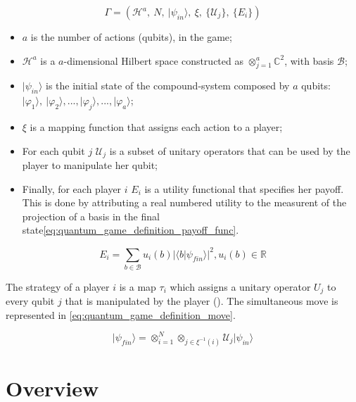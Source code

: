 \begin{equation}
\Gamma=(\mathcal{H}^{a},\: N,\:\vert\psi_{in}\rangle,\:\xi,\:\{\mathcal{U}_{j}\},\:\{E_{i}\})\label{eq:quantum_game_six_tuple}
\end{equation}

\begin{itemize}
\item $a$ is the number of actions (qubits), in the game; 
\item $\mathcal{H}^{a}$ is a $a$-dimensional Hilbert space constructed
as $\otimes_{j=1}^{a}\mathbb{C}^{2}$, with basis $\mathcal{B}$;
\item $\vert\psi_{in}\rangle$ is the initial state of the compound-system
composed by $a$ qubits: $\vert\varphi_{1}\rangle,\:\vert\varphi_{2}\rangle, ..., \vert\varphi_{j}\rangle, ..., \vert\varphi_{a}\rangle$;
\item $\xi$ is a mapping function that assigns each action to a player;
\item For each qubit $j$ $\mathcal{U}_{j}$ is a subset of unitary operators
that can be used by the player to manipulate her qubit;
\item Finally, for each player $i$ $E_{i}$ is a utility functional that
specifies her payoff. This is done by attributing a real numbered utility to the measurent of the projection of a basis in the final state\ref{eq:quantum_game_definition_payoff_func}.\end{itemize}

\begin{equation}
E_{i}=\sum_{b \in \mathcal{B}} u_{i}(b)\vert \langle b\vert \psi_{fin}\rangle\vert^{2}, u_{i}(b) \in \mathbb{R}
\label{eq:quantum_game_definition_payoff_func}
\end{equation}

The strategy of a player $i$ is a map $\tau_{i}$ which assigns a
unitary operator $U_{j}$ to every qubit $j$ that is manipulated
by the player ().
The simultaneous move is represented in \ref{eq:quantum_game_definition_move}.

\begin{equation}
\vert\psi_{fin}\rangle=\otimes_{i=1}^{N}\otimes_{j\in\xi^{-1}(i)}\mathcal{U}_{j}\vert\psi_{in}\rangle\label{eq:quantum_game_definition_move}
\end{equation}

\section{Overview}
\label{sec:background_overview}

